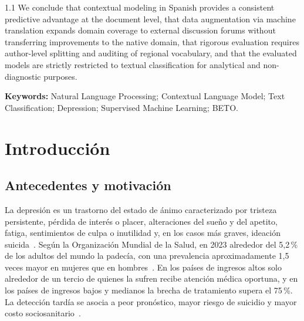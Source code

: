 \documentclass[12pt,a4paper]{article}
\begin{document}
\begin{spacing}{1.1}
We conclude that contextual modeling in Spanish provides a consistent predictive advantage at the document level, that data augmentation via machine translation expands domain coverage to external discussion forums without transferring improvements to the native domain, that rigorous evaluation requires author-level splitting and auditing of regional vocabulary, and that the evaluated models are strictly restricted to textual classification for analytical and non-diagnostic purposes.

\vspace{0.3cm}
\noindent\textbf{Keywords:} Natural Language Processing; Contextual Language Model; Text Classification; Depression; Supervised Machine Learning; BETO.
\end{spacing}

\newpage
{}
\tableofcontents
\newpage
{}
\listoffigures
\vspace{1.5em}
\listoftables
\newpage

\setcounter{page}{1}

\section{Introducción}

\subsection{Antecedentes y motivación}
La depresión es un trastorno del estado de ánimo caracterizado por tristeza persistente, pérdida de interés o placer, alteraciones del sueño y del apetito, fatiga, sentimientos de culpa o inutilidad y, en los casos más graves, ideación suicida~\cite{apa2013dsm5}. Según la Organización Mundial de la Salud, en 2023 alrededor del 5{,}2\,\% de los adultos del mundo la padecía, con una prevalencia aproximadamente 1{,}5 veces mayor en mujeres que en hombres~\cite{who2026depression,who2025mentalhealth}. En los países de ingresos altos solo alrededor de un tercio de quienes la sufren recibe atención médica oportuna, y en los países de ingresos bajos y medianos la brecha de tratamiento supera el 75\,\%. La detección tardía se asocia a peor pronóstico, mayor riesgo de suicidio y mayor costo sociosanitario~\cite{leis2019detecting}.
\end{document}
